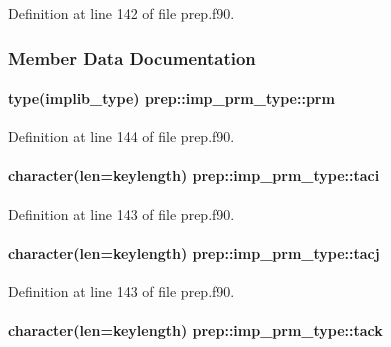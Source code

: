 Definition at line 142 of file prep.\-f90.



\subsubsection{Member Data Documentation}
\hypertarget{structprep_1_1imp__prm__type_aadf94e31722728a3f4052f6559131132}{
\paragraph[{prm}]{\setlength{\rightskip}{0pt plus 5cm}type(implib\-\_\-type) prep\-::imp\-\_\-prm\-\_\-type\-::prm}}\label{structprep_1_1imp__prm__type_aadf94e31722728a3f4052f6559131132}


Definition at line 144 of file prep.\-f90.

\hypertarget{structprep_1_1imp__prm__type_a40f0c0adcf1d32e0dd4faabdfc94bf50}{
\paragraph[{taci}]{\setlength{\rightskip}{0pt plus 5cm}character(len=keylength) prep\-::imp\-\_\-prm\-\_\-type\-::taci}}\label{structprep_1_1imp__prm__type_a40f0c0adcf1d32e0dd4faabdfc94bf50}


Definition at line 143 of file prep.\-f90.

\hypertarget{structprep_1_1imp__prm__type_a35c250f9ceb8bed51a14d5ab60a2bd08}{
\paragraph[{tacj}]{\setlength{\rightskip}{0pt plus 5cm}character(len=keylength) prep\-::imp\-\_\-prm\-\_\-type\-::tacj}}\label{structprep_1_1imp__prm__type_a35c250f9ceb8bed51a14d5ab60a2bd08}


Definition at line 143 of file prep.\-f90.

\hypertarget{structprep_1_1imp__prm__type_a46d235de8a5ee1f551e9a8d9636e14f3}{
\paragraph[{tack}]{\setlength{\rightskip}{0pt plus 5cm}character(len=keylength) prep\-::imp\-\_\-prm\-\_\-type\-::tack}}\label{structprep_1_1imp__prm__type_a46d235de8a5ee1f551e9a8d9636e14f3}



